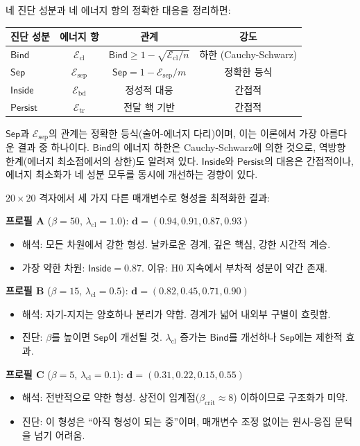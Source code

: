 네 진단 성분과 네 에너지 항의 정확한 대응을 정리하면:

\begin{center}
\begin{tabular}{lccc}
\hline
\textbf{진단 성분} & \textbf{에너지 항} & \textbf{관계} & \textbf{강도} \\
\hline
$\mathsf{Bind}$ & $\mathcal{E}_{\mathrm{cl}}$ & $\mathsf{Bind} \geq 1 - \sqrt{\mathcal{E}_{\mathrm{cl}}/n}$ & 하한 (Cauchy-Schwarz) \\
$\mathsf{Sep}$ & $\mathcal{E}_{\mathrm{sep}}$ & $\mathsf{Sep} = 1 - \mathcal{E}_{\mathrm{sep}}/m$ & 정확한 등식 \\
$\mathsf{Inside}$ & $\mathcal{E}_{\mathrm{bd}}$ & 정성적 대응 & 간접적 \\
$\mathsf{Persist}$ & $\mathcal{E}_{\mathrm{tr}}$ & 전달 핵 기반 & 간접적 \\
\hline
\end{tabular}
\end{center}

$\mathsf{Sep}$과 $\mathcal{E}_{\mathrm{sep}}$의 관계는 정확한 등식(술어-에너지 다리)이며, 이는 이론에서 가장 아름다운 결과 중 하나이다. $\mathsf{Bind}$의 에너지 하한은 Cauchy-Schwarz에 의한 것으로, 역방향 한계(에너지 최소점에서의 상한)도 알려져 있다. $\mathsf{Inside}$와 $\mathsf{Persist}$의 대응은 간접적이나, 에너지 최소화가 네 성분 모두를 동시에 개선하는 경향이 있다.

\begin{example}
\label{ex:three-profiles}
$20 \times 20$ 격자에서 세 가지 다른 매개변수로 형성을 최적화한 결과:

\textbf{프로필 A} ($\beta = 50$, $\lambda_{\mathrm{cl}} = 1.0$): $\mathbf{d} = (0.94, 0.91, 0.87, 0.93)$
\begin{itemize}
    \item 해석: 모든 차원에서 강한 형성. 날카로운 경계, 깊은 핵심, 강한 시간적 계승.
    \item 가장 약한 차원: $\mathsf{Inside} = 0.87$. 이유: H0 지속에서 부차적 성분이 약간 존재.
\end{itemize}

\textbf{프로필 B} ($\beta = 15$, $\lambda_{\mathrm{cl}} = 0.5$): $\mathbf{d} = (0.82, 0.45, 0.71, 0.90)$
\begin{itemize}
    \item 해석: 자기-지지는 양호하나 분리가 약함. 경계가 넓어 내외부 구별이 흐릿함.
    \item 진단: $\beta$를 높이면 $\mathsf{Sep}$이 개선될 것. $\lambda_{\mathrm{cl}}$ 증가는 $\mathsf{Bind}$를 개선하나 $\mathsf{Sep}$에는 제한적 효과.
\end{itemize}

\textbf{프로필 C} ($\beta = 5$, $\lambda_{\mathrm{cl}} = 0.1$): $\mathbf{d} = (0.31, 0.22, 0.15, 0.55)$
\begin{itemize}
    \item 해석: 전반적으로 약한 형성. 상전이 임계점($\beta_{\mathrm{crit}} \approx 8$) 이하이므로 구조화가 미약.
    \item 진단: 이 형성은 ``아직 형성이 되는 중''이며, 매개변수 조정 없이는 원시-응집 문턱을 넘기 어려움.
\end{itemize}
\end{example}


